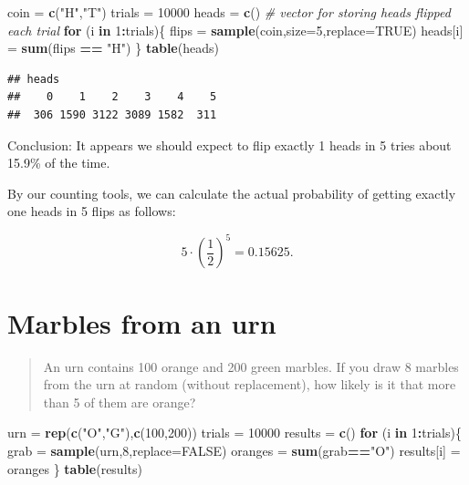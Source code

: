 \documentclass[
]{book}
\newenvironment{Shaded}{\begin{snugshade}}{\end{snugshade}}
\newcommand{\AttributeTok}[1]{\textcolor[rgb]{0.13,0.29,0.53}{#1}}
\newcommand{\CommentTok}[1]{\textcolor[rgb]{0.56,0.35,0.01}{\textit{#1}}}
\newcommand{\ConstantTok}[1]{\textcolor[rgb]{0.56,0.35,0.01}{#1}}
\newcommand{\ControlFlowTok}[1]{\textcolor[rgb]{0.13,0.29,0.53}{\textbf{#1}}}
\newcommand{\DecValTok}[1]{\textcolor[rgb]{0.00,0.00,0.81}{#1}}
\newcommand{\FunctionTok}[1]{\textcolor[rgb]{0.13,0.29,0.53}{\textbf{#1}}}
\newcommand{\NormalTok}[1]{#1}
\newcommand{\OtherTok}[1]{\textcolor[rgb]{0.56,0.35,0.01}{#1}}
\newcommand{\SpecialCharTok}[1]{\textcolor[rgb]{0.81,0.36,0.00}{\textbf{#1}}}
\newcommand{\StringTok}[1]{\textcolor[rgb]{0.31,0.60,0.02}{#1}}
\theoremstyle{definition}
\theoremstyle{definition}
\theoremstyle{definition}
\theoremstyle{definition}
\theoremstyle{remark}
\begin{document}
\begin{Shaded}
\begin{Highlighting}[]
\NormalTok{coin }\OtherTok{=} \FunctionTok{c}\NormalTok{(}\StringTok{"H"}\NormalTok{,}\StringTok{"T"}\NormalTok{)}
\NormalTok{trials }\OtherTok{=} \DecValTok{10000} 
\NormalTok{heads }\OtherTok{=} \FunctionTok{c}\NormalTok{() }\CommentTok{\# vector for storing heads flipped each trial}
\ControlFlowTok{for}\NormalTok{ (i }\ControlFlowTok{in} \DecValTok{1}\SpecialCharTok{:}\NormalTok{trials)\{}
\NormalTok{  flips }\OtherTok{=} \FunctionTok{sample}\NormalTok{(coin,}\AttributeTok{size=}\DecValTok{5}\NormalTok{,}\AttributeTok{replace=}\ConstantTok{TRUE}\NormalTok{)}
\NormalTok{  heads[i] }\OtherTok{=} \FunctionTok{sum}\NormalTok{(flips }\SpecialCharTok{==} \StringTok{"H"}\NormalTok{)}
\NormalTok{\}}
\FunctionTok{table}\NormalTok{(heads)}
\end{Highlighting}
\end{Shaded}

\begin{verbatim}
## heads
##    0    1    2    3    4    5 
##  306 1590 3122 3089 1582  311
\end{verbatim}

Conclusion: It appears we should expect to flip exactly 1 heads in 5 tries about 15.9\% of the time.

By our counting tools, we can calculate the actual probability of getting exactly one heads in 5 flips as follows:

\[5\cdot \left(\frac{1}{2}\right)^5 = 0.15625.\]

\section{Marbles from an urn}\label{marbles-urn-R}

\begin{quote}
An urn contains 100 orange and 200 green marbles. If you draw 8 marbles from the urn at random (without replacement), how likely is it that more than 5 of them are orange?
\end{quote}

\begin{Shaded}
\begin{Highlighting}[]
\NormalTok{urn }\OtherTok{=} \FunctionTok{rep}\NormalTok{(}\FunctionTok{c}\NormalTok{(}\StringTok{"O"}\NormalTok{,}\StringTok{"G"}\NormalTok{),}\FunctionTok{c}\NormalTok{(}\DecValTok{100}\NormalTok{,}\DecValTok{200}\NormalTok{))}
\NormalTok{trials }\OtherTok{=} \DecValTok{10000}
\NormalTok{results }\OtherTok{=} \FunctionTok{c}\NormalTok{()}
\ControlFlowTok{for}\NormalTok{ (i }\ControlFlowTok{in} \DecValTok{1}\SpecialCharTok{:}\NormalTok{trials)\{}
\NormalTok{  grab }\OtherTok{=} \FunctionTok{sample}\NormalTok{(urn,}\DecValTok{8}\NormalTok{,}\AttributeTok{replace=}\ConstantTok{FALSE}\NormalTok{)}
\NormalTok{  oranges }\OtherTok{=} \FunctionTok{sum}\NormalTok{(grab}\SpecialCharTok{==}\StringTok{"O"}\NormalTok{)}
\NormalTok{  results[i] }\OtherTok{=}\NormalTok{ oranges}
\NormalTok{\}}
\FunctionTok{table}\NormalTok{(results)}
\end{Highlighting}
\end{Shaded}
\end{document}
